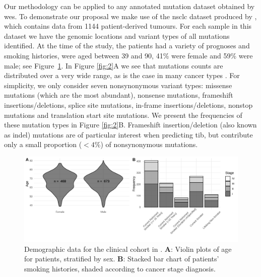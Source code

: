 \documentclass[12pt]{article}
\begin{document}
Our methodology can be applied to any annotated mutation dataset obtained by \gls{wes}.
To demonstrate our proposal we make use of the \gls{nsclc} dataset produced by \citet{campbell_distinct_2016}, which contains data from 1144 patient-derived tumours.  For each sample in this dataset we have the genomic locations and variant types of all mutations identified.  At the time of the study, the patients had a variety of prognoses and smoking histories, were aged between 39 and 90, 41\% were female and 59\% were male; see Figure~\ref{fig:1}. In Figure \ref{fig:2}A we see that mutations counts are distributed over a very wide range, as is the case in many cancer types \citep{chalmers_analysis_2017}. For simplicity, we only consider seven nonsynonymous variant types: missense mutations (which are the most abundant), nonsense mutations, frameshift insertions/deletions, splice site mutations, in-frame insertions/deletions, nonstop mutations and translation start site mutations.  We present the frequencies of these mutation types in Figure \ref{fig:2}B. Frameshift insertion/deletion (also known as indel) mutations are of particular interest when predicting \gls{tib}, but contribute only a small proportion ($<4\%$) of nonsynonymous mutations. 

\begin{figure}[htbp]
\centering
\includegraphics[width=6in]{figures/fig1.png}
\vspace*{-5mm}
\caption{Demographic data for the clinical cohort in \citet{campbell_distinct_2016}. \textbf{A}: Violin plots of age for patients, stratified by sex. \textbf{B}: Stacked bar chart of patients' smoking histories, shaded according to cancer stage diagnosis. \label{fig:1}}
\vspace*{-2mm}
\end{figure}
\end{document}
